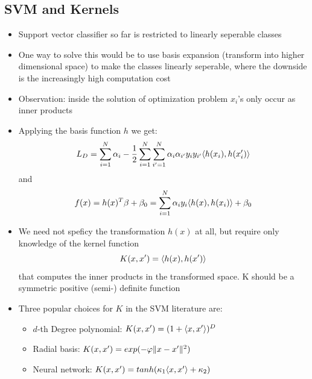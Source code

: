 \subsection*{SVM and Kernels}
\begin{itemize}
    \item
        Support vector classifier so far is restricted to linearly seperable classes
    \item
        One way to solve this would be to use basis expansion (transform into higher dimensional space) to make the classes linearly seperable, where the downside is the increasingly high computation cost
    \item
        Observation: inside the solution of optimization problem $x_i$'s only occur as inner products
    \item
        Applying the basis function $h$ we get:
        $$ L_D = \sum_{i=1}^N \alpha_i - \frac{\displaystyle 1}{\displaystyle 2} \sum_{i=1}^N \sum_{i'=1}^N \alpha_i \alpha_{i'} y_i y_{i'} \langle h(x_i), h(x_i')\rangle$$
        and
        $$ f(x) = h(x)^T \beta + \beta_0 = \sum_{i=1}^{N} \alpha_i y_i \langle h(x), h(x_i)\rangle + \beta_0$$
    \item
        We need not speficy the transformation $h(x)$ at all, but require only knowledge of the kernel function
        $$ K(x, x') = \langle h(x), h(x')\rangle$$
        that computes the inner products in the transformed space. K should be a symmetric positive (semi-) definite function
    \item
        Three popular choices for $K$ in the SVM literature are:
        \begin{itemize}
            \item
                $d$-th Degree polynomial: $K(x, x') = (1 + \langle x, x'\rangle)^D$
            \item
                Radial basis: $K(x,x') = exp(-\varphi \lVert x-x'\rVert^2)$
            \item
                Neural network: $K(x, x') = tanh(\kappa_1 \langle x, x'\rangle + \kappa_2)$
        \end{itemize}
\end{itemize}

